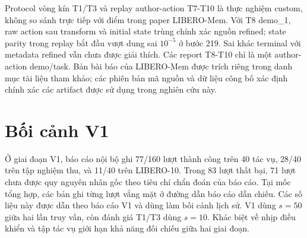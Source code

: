 \endgroup

\clearpage
Protocol vòng kín T1/T3 và replay author-action T7-T10 là thực nghiệm custom, không so sánh trực tiếp với điểm trong paper LIBERO-Mem. Với T8 demo\_1, raw action sau transform và initial state trùng chính xác nguồn refined; state parity trong replay bắt đầu vượt dung sai $10^{-5}$ ở bước 219. Sai khác terminal với metadata refined vẫn chưa được giải thích. Các report T8-T10 chỉ là một author-action demo/task. Bản bài báo của LIBERO-Mem được trích riêng trong danh mục tài liệu tham khảo; các phiên bản mã nguồn và dữ liệu công bố xác định chính xác các artifact được sử dụng trong nghiên cứu này.

\section{Bối cảnh V1}
Ở giai đoạn V1, báo cáo nội bộ ghi 77/160 lượt thành công trên 40 tác vụ,
28/40 trên tập nghiệm thu, và 11/40 trên LIBERO-10. Trong 83 lượt thất bại,
71 lượt chưa được quy nguyên nhân gốc theo tiêu chí chẩn đoán của báo cáo.
Tại mốc tổng hợp, các bản ghi từng lượt vắng mặt ở đường dẫn báo cáo dẫn chiếu.
Các số liệu này được dẫn theo báo cáo V1 và dùng làm bối cảnh lịch sử.
V1 dùng $s=50$ giữa hai lần truy vấn, còn đánh giá T1/T3 dùng $s=10$.
Khác biệt về nhịp điều khiển và tập tác vụ giới hạn khả năng đối chiếu giữa hai giai đoạn.

